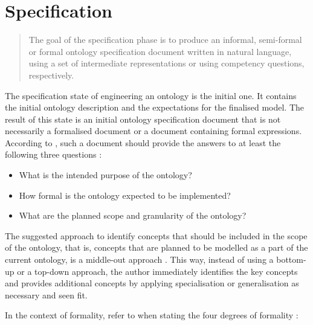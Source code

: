 \chapter{Specification}\label{ch:Specification}

\blockquote[{{\cite[p. 2]{fernandez-lopez1997METHONTOLOGYOntologicalArt}}}]{The goal of the specification phase is to produce an informal, semi-formal or formal ontology specification document written in natural language, using a set of intermediate representations or using competency questions, respectively.}

The specification state of engineering an ontology is the initial one. It contains the initial ontology description and the expectations for the finalised model. The result of this state is an initial ontology specification document that is not necessarily a formalised document or a document containing formal expressions. According to \citeauthor{fernandez-lopez1997METHONTOLOGYOntologicalArt}, such a document should provide the answers to at least the following three questions
\cite{fernandez-lopez1997METHONTOLOGYOntologicalArt}%
:

\begin{itemize}
    \item What is the intended purpose of the ontology?
    \item How formal is the ontology expected to be implemented?
    \item What are the planned scope and granularity of the ontology?
\end{itemize}

The suggested approach to identify concepts that should be included in the scope of the ontology, that is, concepts that are planned to be modelled as a part of the current ontology, is a middle-out approach \cite{fernandez-lopez1997METHONTOLOGYOntologicalArt,uschold1996OntologiesPrinciplesMethods}. This way, instead of using a bottom-up or a top-down approach, the author immediately identifies the key concepts and provides additional concepts by applying specialisation or generalisation as necessary and seen fit.

In the context of formality, \citeauthor{fernandez-lopez1997METHONTOLOGYOntologicalArt} refer to \citeauthor{uschold1996OntologiesPrinciplesMethods} when stating the four degrees of formality \cite{uschold1996OntologiesPrinciplesMethods}:

